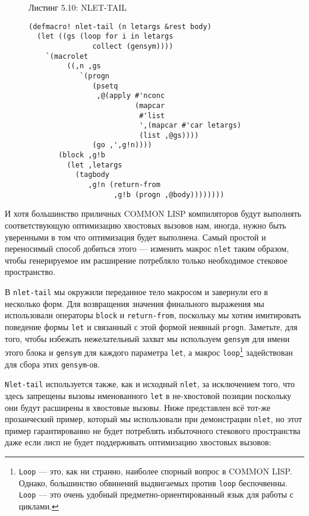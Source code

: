 \begin{figure}Листинг 5.10: NLET-TAIL\label{listing_5.10}
\listbegin
\begin{verbatim}
(defmacro! nlet-tail (n letargs &rest body)
  (let ((gs (loop for i in letargs
               collect (gensym))))
    `(macrolet
         ((,n ,gs
            `(progn
               (psetq
                ,@(apply #'nconc
                         (mapcar
                          #'list
                          ',(mapcar #'car letargs)
                          (list ,@gs))))
               (go ,',g!n))))
       (block ,g!b
         (let ,letargs
           (tagbody
              ,g!n (return-from
                    ,g!b (progn ,@body))))))))
\end{verbatim}
\listend
\end{figure}

И хотя большинство приличных COMMON LISP компиляторов будут выполнять соответствующую оптимизацию хвостовых вызовов нам, иногда, нужно быть уверенными в том что оптимизация будет выполнена. Самый простой и переносимый способ добиться этого --- изменить макрос \verb"nlet" таким образом, чтобы генерируемое им расширение потребляло только необходимое стековое пространство.

В \verb"nlet-tail" мы окружили переданное тело макросом и завернули его в несколько форм. Для возвращения значения финального выражения мы использовали операторы \verb"block" и \verb"return-from", поскольку мы хотим имитировать поведение формы \verb"let" и связанный с этой формой неявный \verb"progn". Заметьте, для того, чтобы избежать нежелательный захват мы используем \verb"gensym" для имени этого блока и \verb"gensym" для каждого параметра \verb"let", а макрос \verb"loop"\footnote{\verb"Loop" --- это, как ни странно, наиболее спорный вопрос в COMMON LISP. Однако, большинство обвинений выдвигаемых против \verb"loop" беспочвенны. \verb"Loop" --- это очень удобный предметно-ориентированный язык для работы с циклами.} задействован для сбора этих \verb"gensym"-ов.



\verb"Nlet-tail" используется также, как и исходный \verb"nlet", за исключением того, что здесь запрещены вызовы именованного \verb"let" в не-хвостовой позиции поскольку они будут расширены в хвостовые вызовы. Ниже представлен всё тот-же прозаический пример, который мы использовали при демонстрации \verb"nlet", но этот пример гарантированно не будет потреблять избыточного стекового пространства даже если лисп не будет поддерживать оптимизацию хвостовых вызовов:

